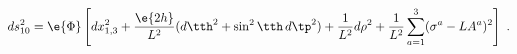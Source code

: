 \begin{equation}
\label{metric10}
  ds_{10}^2 = \e{\Phi} \left[ dx_{1,3}^2 + \frac{\e{2h}}{L^2}
  (d \tth^2 +\sin^2 \tth \, d\tp^2) +\frac1{L^2} d\rho^2
  +\frac1{L^2} \sum\limits_{a=1}^3 (\sigma^a-L A^a)^2
  \right]~.
\end{equation}


